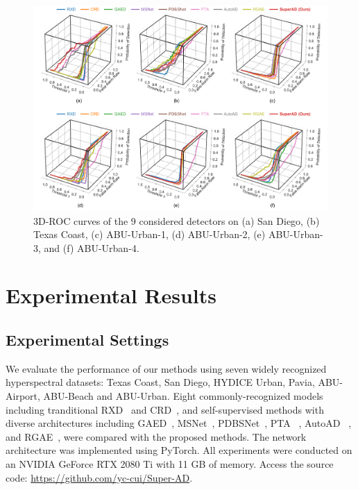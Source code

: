\begin{figure}[htbp]
  \centering
  \includegraphics[width=1\linewidth]{Figures/PDF/3droc_all.pdf}
  \caption{3D-ROC curves of the 9 considered detectors on (a) San Diego, (b) Texas Coast, (c) ABU-Urban-1, (d) ABU-Urban-2, (e) ABU-Urban-3, and (f) ABU-Urban-4.}
  \label{fig:cmp-all-models-3droc}
\end{figure}


\section{Experimental Results}\label{Experimentss}




\subsection{Experimental Settings}




We evaluate the performance of our methods using seven widely recognized hyperspectral datasets: Texas Coast, San Diego, HYDICE Urban, Pavia, ABU-Airport, ABU-Beach and ABU-Urban. Eight commonly-recognized models including tranditional RXD~\cite{RXD} and CRD~\cite{CRD}, and self-supervised methods with diverse architectures including GAED~\cite{GAED}, MSNet~\cite{MSNet}, PDBSNet~\cite{PDBSNet}, PTA ~\cite{PTA}, AutoAD ~\cite{AutoAD}, and RGAE~\cite{RGAE}, were compared with the proposed methods.
The network architecture was implemented using PyTorch. All experiments were conducted on an NVIDIA GeForce RTX 2080 Ti with 11 GB of memory. Access the source code: \url{https://github.com/yc-cui/Super-AD}.

